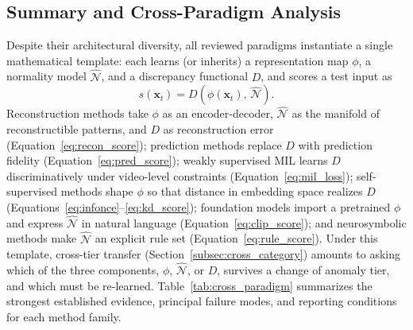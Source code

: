 \documentclass[10pt,a4paper]{article}
\begin{document}
\subsection{Summary and Cross-Paradigm Analysis}
\label{subsec:method_summary}

Despite their architectural diversity, all reviewed paradigms instantiate a single mathematical template: each learns (or inherits) a representation map $\phi$, a normality model $\widehat{\mathcal{N}}$, and a discrepancy functional $D$, and scores a test input as
\begin{equation}
    s(\mathbf{x}_t) = D\!\left( \phi(\mathbf{x}_t), \, \widehat{\mathcal{N}} \right).
    \label{eq:unified_score}
\end{equation}
Reconstruction methods take $\phi$ as an encoder-decoder, $\widehat{\mathcal{N}}$ as the manifold of reconstructible patterns, and $D$ as reconstruction error (Equation~\ref{eq:recon_score}); prediction methods replace $D$ with prediction fidelity (Equation~\ref{eq:pred_score}); weakly supervised MIL learns $D$ discriminatively under video-level constraints (Equation~\ref{eq:mil_loss}); self-supervised methods shape $\phi$ so that distance in embedding space realizes $D$ (Equations~\ref{eq:infonce}--\ref{eq:kd_score}); foundation models import a pretrained $\phi$ and express $\widehat{\mathcal{N}}$ in natural language (Equation~\ref{eq:clip_score}); and neurosymbolic methods make $\widehat{\mathcal{N}}$ an explicit rule set (Equation~\ref{eq:rule_score}). Under this template, cross-tier transfer (Section~\ref{subsec:cross_category}) amounts to asking which of the three components, $\phi$, $\widehat{\mathcal{N}}$, or $D$, survives a change of anomaly tier, and which must be re-learned. Table~\ref{tab:cross_paradigm} summarizes the strongest established evidence, principal failure modes, and reporting conditions for each method family.
\end{document}
